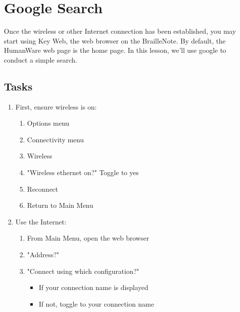 \documentclass[10pt,letterpaper,twoside]{report}
\begin{document}
{\clearpage
\section{Google Search}
Once the wireless or other Internet connection has been established, you may start using Key Web, the web browser on the BrailleNote. By default, the HumanWare web page is the home page. In this lesson, we'll use google to conduct a simple search.	
\subsection{Tasks}
\begin{enumerate}
	\item First, ensure wireless is on:
	      \begin{enumerate}
		      \item Options menu 
		      \item Connectivity menu 
		      \item Wireless 
		      \item "Wireless ethernet on?" Toggle to yes 
		      \item Reconnect 
		      \item Return to Main Menu 
	      \end{enumerate}
	\item Use the Internet:
	      \begin{enumerate}
		      \item From Main Menu, open the web browser 
		      \item "Address?" 
		      \item "Connect using which configuration?"
		            \begin{itemize}
			            \item If your connection name is displayed 
			            \item If not, toggle to your connection name 

\end{itemize}
\end{enumerate}
\end{enumerate}}
\end{document}
